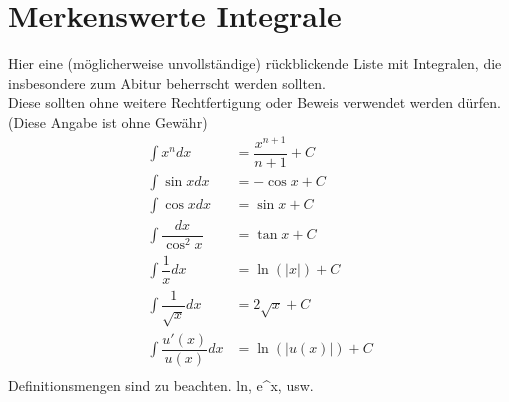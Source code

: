 \section{Merkenswerte Integrale}
Hier eine (möglicherweise unvollständige) rückblickende Liste mit Integralen, die insbesondere zum Abitur beherrscht werden sollten.\\
Diese sollten ohne weitere Rechtfertigung oder Beweis verwendet werden dürfen. (Diese Angabe ist ohne Gewähr)\\
\begin{align*}
  \int x^n dx &=\dfrac{x^{n+1}}{n+1} + C\\
  \int\sin x dx &= -\cos x + C\\
  \int\cos x dx &= \sin x + C\\
  \int\dfrac{ dx}{\cos^2x} &= \tan x + C\\
  \int\dfrac{1}{x} dx &= \ln(|x|) + C\\
  \int\dfrac{1}{\sqrt{x}}dx &= 2\sqrt{x} + C\\
  \int \dfrac{u'(x)}{u(x)} dx &= \ln(|u(x)|) + C\\

\end{align*}
\danger Definitionsmengen sind zu beachten.
ln, e^x, usw.
